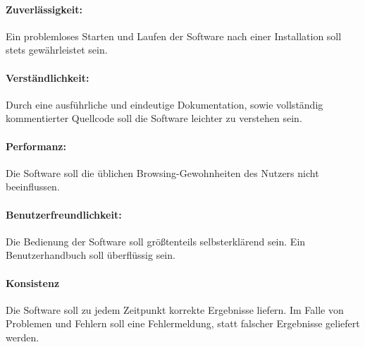 \documentclass[11pt]{scrreprt}
\begin{document}
\paragraph{Zuverlässigkeit:} Ein problemloses Starten und Laufen der Software nach einer Installation soll stets gewährleistet sein.

\paragraph{Verständlichkeit:} Durch eine ausführliche und eindeutige Dokumentation, sowie vollständig kommentierter Quellcode soll die Software leichter zu verstehen sein.

\paragraph{Performanz:} Die Software soll die üblichen Browsing-Gewohnheiten des Nutzers nicht beeinflussen.

\paragraph{Benutzerfreundlichkeit:} Die Bedienung der Software soll größtenteils selbsterklärend sein. Ein Benutzerhandbuch soll überflüssig sein.

\paragraph{Konsistenz} Die Software soll zu jedem Zeitpunkt korrekte Ergebnisse liefern. Im Falle von Problemen und Fehlern soll eine Fehlermeldung, statt falscher Ergebnisse geliefert werden.
\end{document}
